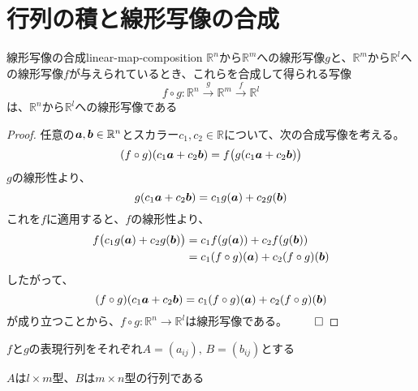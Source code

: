 \documentclass[../../../topic_linear-algebra]{subfiles}
\begin{document}
\sectionline
\section{行列の積と線形写像の合成}

\begin{mindflow}
\end{mindflow}

\begin{theorem}{線形写像の合成}{linear-map-composition}
  $\mathbb{R}^n$から$\mathbb{R}^m$への線形写像$g$と、$\mathbb{R}^m$から$\mathbb{R}^l$への線形写像$f$が与えられているとき、これらを合成して得られる写像
  \begin{equation*}
    f \circ g\colon \mathbb{R}^n \xrightarrow{g} \mathbb{R}^m \xrightarrow{f} \mathbb{R}^l
  \end{equation*}
  は、$\mathbb{R}^n$から$\mathbb{R}^l$への線形写像である
\end{theorem}

\begin{proof}
  任意の$\vb*{a},\vb*{b} \in \mathbb{R}^n$とスカラー$c_1,c_2 \in \mathbb{R}$について、次の合成写像を考える。
  \begin{equation*}
    (f \circ g)(c_1\vb*{a}+c_2\vb*{b}) = f\bigl(g(c_1\vb*{a}+c_2\vb*{b})\bigr)
  \end{equation*}
  $g$の線形性より、
  \begin{equation*}
    g(c_1\vb*{a}+c_2\vb*{b}) = c_1 g(\vb*{a}) + c_2 g(\vb*{b})
  \end{equation*}
  これを$f$に適用すると、$f$の線形性より、
  \begin{align*}
    f\bigl(c_1 g(\vb*{a}) + c_2 g(\vb*{b})\bigr) &= c_1 f(g(\vb*{a})) + c_2 f(g(\vb*{b})) \\
    &= c_1(f \circ g)(\vb*{a}) + c_2(f \circ g)(\vb*{b})
  \end{align*}
  したがって、
  \begin{equation*}
    (f \circ g)(c_1\vb*{a}+c_2\vb*{b}) = c_1(f \circ g)(\vb*{a}) + c_2(f \circ g)(\vb*{b})
  \end{equation*}
  が成り立つことから、$f \circ g \colon \mathbb{R}^n \to \mathbb{R}^l$は線形写像である。 $\qed$
\end{proof}

$f$と$g$の表現行列をそれぞれ$A = (a_{ij}), \, B = (b_{ij})$とする

$A$は$l \times m$型、$B$は$m \times n$型の行列である
\end{document}
